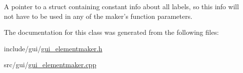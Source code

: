 A pointer to a struct containing constant info about all labels, so this info will not have to be used in any of the maker's function parameters. 



The documentation for this class was generated from the following files\-:\begin{DoxyCompactItemize}
\item 
include/gui/\hyperlink{gui__elementmaker_8h}{gui\-\_\-elementmaker.\-h}\item 
src/gui/\hyperlink{gui__elementmaker_8cpp}{gui\-\_\-elementmaker.\-cpp}\end{DoxyCompactItemize}
